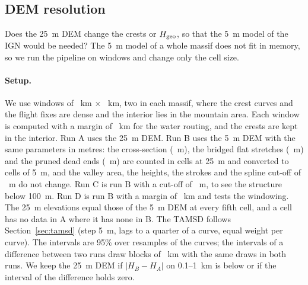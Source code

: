 \subsection{DEM resolution}\label{sec:demres}

Does the 25~m DEM change the crests or $H_{\mathrm{geo}}$, so that the 5~m model of the IGN would be needed? The 5~m model of a whole massif does not fit in memory, so we run the pipeline on windows and change only the cell size.

\paragraph{Setup.} We use \DrWindows{} windows of \DrBox{}~km $\times$ \DrBox{}~km, two in each massif, where the crest curves and the flight fixes are dense and the interior lies in the mountain area. Each window is computed with a margin of \DrMargin{}~km for the water routing, and the crests are kept in the interior. Run A uses the 25~m DEM. Run B uses the 5~m DEM with the same parameters in metres: the cross-section (\DrXsec~m), the bridged flat stretches (\DrBridge~m) and the pruned dead ends (\DrPrune~m) are counted in cells at 25~m and converted to cells of 5~m, and the valley area, the heights, the strokes and the spline cut-off of \DrSmooth~m do not change. Run C is run B with a cut-off of \DrSmoothC~m, to see the structure below 100~m. Run D is run B with a margin of \DrMarginD~km and tests the windowing. The 25~m elevations equal those of the 5~m DEM at every fifth cell, and a cell has no data in A where it has none in B. The TAMSD follows Section~\ref{sec:tamsd} (step 5~m, lags to a quarter of a curve, equal weight per curve). The intervals are 95\% over \DrBoot{} resamples of the curves; the intervals of a difference between two runs draw blocks of \DrBlock~km with the same draws in both runs. We keep the 25~m DEM if $|H_B - H_A|$ on 0.1--1~km is below \DrKeep{} or if the interval of the difference holds zero.

